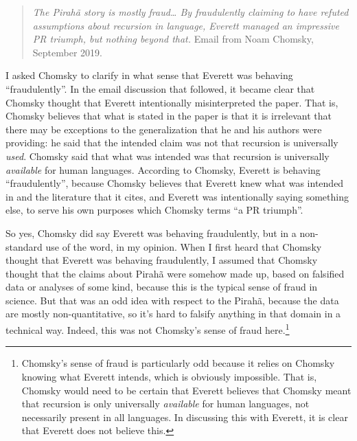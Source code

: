 \documentclass{article}
\begin{document}
\begin{quote}
    \textit{The Pirahã story is mostly fraud… By fraudulently claiming to have refuted assumptions about recursion in language, Everett managed an impressive PR triumph, but nothing beyond that.}  Email from Noam Chomsky, September 2019.
\end{quote}

I asked Chomsky to clarify in what sense that Everett was behaving ``fraudulently''. In the email discussion that followed, it became clear that Chomsky thought that Everett intentionally misinterpreted the \cite{hauser2002faculty} paper.  That is, Chomsky believes that what is stated in the \cite{hauser2002faculty} paper is that it is irrelevant that there may be exceptions to the generalization that he and his authors were providing: he said that the intended claim was not that recursion is universally \textit{used}. Chomsky said that what was intended was that recursion is universally \textit{available} for human languages. According to Chomsky, Everett is behaving ``fraudulently'', because Chomsky believes that Everett knew what was intended in \cite{hauser2002faculty} and the literature that it cites, and Everett was intentionally saying something else, to serve his own purposes which Chomsky terms ``a PR triumph''. 

So yes, Chomsky did say Everett was behaving fraudulently, but in a non-standard use of the word, in my opinion. When I first heard that Chomsky thought that Everett was behaving fraudulently, I assumed that Chomsky thought that the claims about Pirahã were somehow made up, based on falsified data or analyses of some kind, because this is the typical sense of fraud in science.  But that was an odd idea with respect to the Pirahã, because the data are mostly non-quantitative, so it's hard to falsify anything in that domain in a technical way. Indeed, this was not Chomsky's sense of fraud here.\footnote{Chomsky's sense of fraud is particularly odd because it relies on Chomsky knowing what Everett intends, which is obviously impossible. That is, Chomsky would need to be certain that Everett believes that Chomsky meant that recursion is only universally \textit{available} for human languages, not necessarily present in all languages. In discussing this with Everett, it is clear that Everett does not believe this.}
\end{document}
